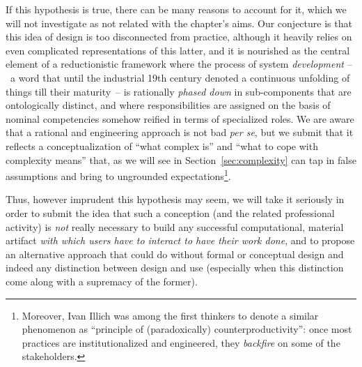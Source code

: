 \documentclass{article}
\begin{document}
If this hypothesis is true, there can be many reasons to account for it, which we will not investigate as not related with the chapter's aims. Our conjecture is that this idea of design is too disconnected from practice, although it heavily relies on even complicated representations of this latter, and it is nourished as the central element of a reductionistic framework where the process of system \emph{development} --~a word that until the industrial 19th century denoted a continuous unfolding of things till their maturity~-- is rationally \emph{phased down} in sub-components that are ontologically distinct, and where responsibilities are assigned on the basis of nominal competencies somehow reified in terms of specialized roles. We are aware that a rational and engineering approach is not bad \emph{per se}, but we submit that it reflects a conceptualization of ``what complex is'' and ``what to cope with complexity means'' that, as we will see in Section~\ref{sec:complexity} can tap in false assumptions and bring to ungrounded expectations\footnote{Moreover, Ivan Illich was among the first thinkers to denote a similar phenomenon as ``principle of (paradoxically) counterproductivity'': once most practices are institutionalized and engineered, they \emph{backfire} on some of the stakeholders.}. 

Thus, however imprudent this hypothesis may seem, we will take it seriously in order to submit the idea that such a conception (and the related professional activity) is \emph{not} really necessary to build any successful computational, material artifact \emph{with which users have to interact to have their work done}, and to propose an alternative approach that could do without formal or conceptual design and indeed any distinction between design and use (especially when this distinction come along with a supremacy of the former).  
\end{document}
